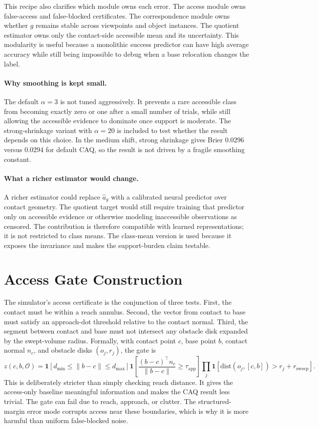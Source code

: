 \documentclass{article}
\newcommand{\gate}{z}
\newcommand{\aff}{a}
\newcommand{\class}{g}
\newcommand{\ind}{\mathbf{1}}
\begin{document}
This recipe also clarifies which module owns each error. The access module owns false-access and false-blocked certificates. The correspondence module owns whether $\class$ remains stable across viewpoints and object instances. The quotient estimator owns only the contact-side accessible mean and its uncertainty. This modularity is useful because a monolithic success predictor can have high average accuracy while still being impossible to debug when a base relocation changes the label.

\paragraph{Why smoothing is kept small.}
The default $\alpha=3$ is not tuned aggressively. It prevents a rare accessible class from becoming exactly zero or one after a small number of trials, while still allowing the accessible evidence to dominate once support is moderate. The strong-shrinkage variant with $\alpha=20$ is included to test whether the result depends on this choice. In the medium shift, strong shrinkage gives Brier 0.0296 versus 0.0294 for default CAQ, so the result is not driven by a fragile smoothing constant.

\paragraph{What a richer estimator would change.}
A richer estimator could replace $\hat{\aff}_g$ with a calibrated neural predictor over contact geometry. The quotient target would still require training that predictor only on accessible evidence or otherwise modeling inaccessible observations as censored. The contribution is therefore compatible with learned representations; it is not restricted to class means. The class-mean version is used because it exposes the invariance and makes the support-burden claim testable.

\section{Access Gate Construction}

The simulator's access certificate is the conjunction of three tests. First, the contact must be within a reach annulus. Second, the vector from contact to base must satisfy an approach-dot threshold relative to the contact normal. Third, the segment between contact and base must not intersect any obstacle disk expanded by the swept-volume radius. Formally, with contact point $c$, base point $b$, contact normal $n_c$, and obstacle disks $(o_j,r_j)$, the gate is
\[
    \gate(c,b,\mathcal{O}) =
    \ind[d_{\min}\leq \|b-c\|\leq d_{\max}]
    \ind\left[\frac{(b-c)^\top n_c}{\|b-c\|}\geq \tau_{\mathrm{app}}\right]
    \prod_j \ind[\mathrm{dist}(o_j,[c,b])>r_j+r_{\mathrm{sweep}}].
\]
This is deliberately stricter than simply checking reach distance. It gives the access-only baseline meaningful information and makes the CAQ result less trivial. The gate can fail due to reach, approach, or clutter. The structured-margin error mode corrupts access near these boundaries, which is why it is more harmful than uniform false-blocked noise.
\end{document}
